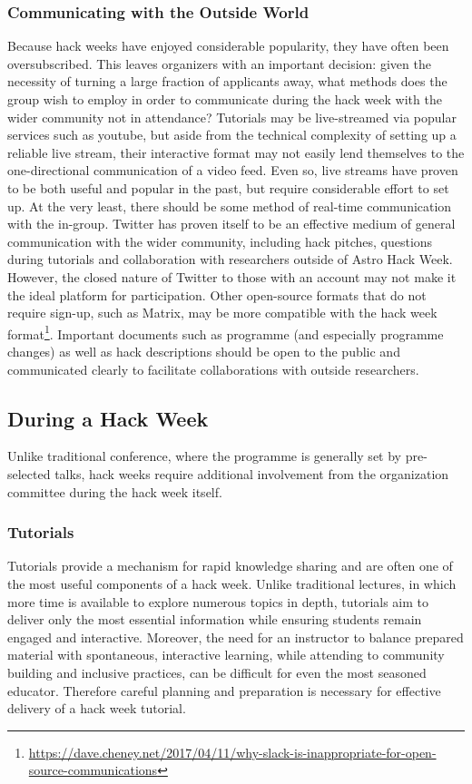\documentclass{nature}
\begin{document}
\subsubsection{Communicating with the Outside World}

Because hack weeks have enjoyed considerable popularity, they have often been oversubscribed. This leaves organizers with an important decision: given the necessity of turning a large fraction of applicants away, what methods does the group wish to employ in order to communicate during the hack week with the wider community not in attendance? Tutorials may be live-streamed via popular services such as youtube, but aside from the technical complexity of setting up a reliable live stream, their interactive format may not easily lend themselves to the one-directional communication of a video feed. Even so, live streams have proven to be both useful and popular in the past, but require considerable effort to set up. At the very least, there should be some method of real-time communication with the in-group. Twitter has proven itself to be an effective medium of general communication with the wider community, including hack pitches, questions during tutorials and collaboration with researchers outside of Astro Hack Week. However, the closed nature of Twitter to those with an account may not make it the ideal platform for participation. Other open-source formats that do not require sign-up, such as Matrix, may be more compatible with the hack week format\footnote{\url{https://dave.cheney.net/2017/04/11/why-slack-is-inappropriate-for-open-source-communications}}. Important documents such as programme (and especially programme changes) as well as hack descriptions should be open to the public and communicated clearly to facilitate collaborations with outside researchers.

\subsection{During a Hack Week}

Unlike traditional conference, where the programme is generally set by pre-selected talks, hack weeks require additional involvement from the organization committee during the hack week itself.

\subsubsection{Tutorials}
Tutorials provide a mechanism for rapid knowledge sharing and are often one of the most useful components of a hack week. Unlike traditional lectures, in which more time is available to explore numerous topics in depth, tutorials aim to deliver only the most essential information while ensuring students remain engaged and interactive. Moreover, the need for an instructor to balance prepared material with spontaneous, interactive learning, while attending to community building and inclusive practices, can be difficult for even the most seasoned educator. Therefore careful planning and preparation is necessary for effective delivery of a hack week tutorial.
\end{document}
